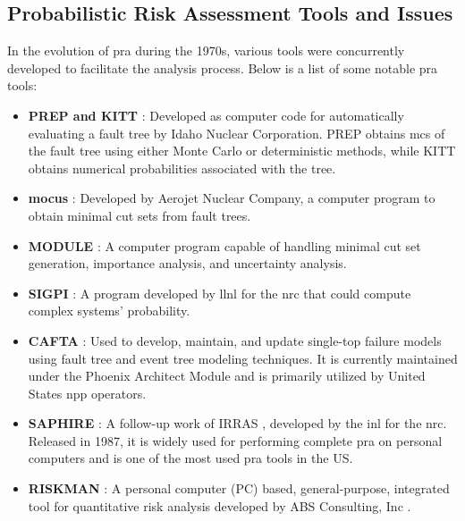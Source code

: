 \subsection{Probabilistic Risk Assessment Tools and Issues}
\label{sec:pra_tools_history}

In the evolution of \acrshort{pra} during the 1970s, various tools were concurrently developed to facilitate the analysis process. Below is a list of some notable \acrshort{pra} tools:

\begin{itemize}
\item \textbf{PREP and KITT} \cite{18}: Developed as computer code for automatically evaluating a fault tree by Idaho Nuclear Corporation. PREP obtains \acrshort{mcs} of the fault tree using either Monte Carlo or deterministic methods, while KITT obtains numerical probabilities associated with the tree.

\item \textbf{\acrshort{mocus}} \cite{19}: Developed by Aerojet Nuclear Company, a computer program to obtain minimal cut sets from fault trees.

\item \textbf{MODULE} \cite{20}: A computer program capable of handling minimal cut set generation, importance analysis, and uncertainty analysis.

\item \textbf{SIGPI} \cite{21}: A program developed by \acrshort{llnl} for the \acrshort{nrc} that could compute complex systems' probability.

\item \textbf{CAFTA} \cite{22}: Used to develop, maintain, and update single-top failure models using fault tree and event tree modeling techniques. It is currently maintained under the Phoenix Architect Module \cite{23} and is primarily utilized by United States \acrshort{npp} operators.

\item \textbf{SAPHIRE} \cite{24}: A follow-up work of IRRAS \cite{25,26}, developed by the \acrshort{inl} for the \acrshort{nrc}. Released in 1987, it is widely used for performing complete \acrshort{pra} on personal computers and is one of the most used \acrshort{pra} tools in the US.

\item \textbf{RISKMAN} \cite{27}: A personal computer (PC) based, general-purpose, integrated tool for quantitative risk analysis developed by ABS Consulting, Inc \cite{28}.


\end{itemize}

